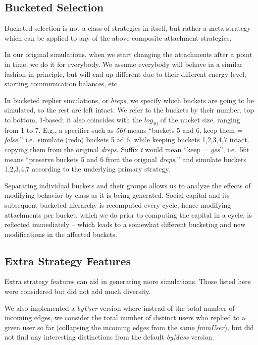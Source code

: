 \documentclass[10pt,oneside]{memoir}
\begin{document}
\begin{Spacing}{2}
\subsection{Bucketed Selection}
\label{bucketedselection}

Bucketed selection is not a class of strategies in itself, but rather a meta-strategy which can be applied to any of the above composite attachment strategies.


In our original simulations, when we start changing the attachments after a point in time, we do it for everybody.  We assume everybody will behave in a similar fashion in principle, but will end up different due to their different energy level, starting communication balances, etc.


In bucketed replier simulations, or {\itshape breps}, we specify which buckets are going to be simulated, so the rest are left intact.  We refer to the buckets by their number, top to bottom, 1-based; it also coincides with the $log_{10}$ of the nucket size, ranging from 1 to 7.  E.g., a specifier such as {\itshape 56f} means ``buckets 5 and 6, keep them = {\itshape false},'' i.e.\ simulate (redo) buckets 5 ad 6, while keeping buckets {1,2,3,4,7} intact, copying them from the original {\itshape dreps}.  Suffix {\itshape t} would mean ``keep = {\itshape yes}'', i.e.\ 56t means ``preserve buckets 5 and 6 from the original {\itshape dreps},'' and simulate buckets {1,2,3,4,7} according to the underlying primary strategy.


Separating individual buckets and their groups allows us to analyze the effects of modifying behavior by class as it is being generated.  Social capital and its subsequent bucketed hierarchy is recomputed every cycle, hence modifying attachments per bucket, which we do prior to computing the capital in a cycle, is reflected immediately -- which leads to a somewhat different bucketing and new modifications in the affected buckets.


\subsection{Extra Strategy Features}
\label{extrastrategyfeatures}

\label{section:extra-strategy-features}
Extra strategy features can aid in generating more simulations.  Those listed here were considered but did not add much diversity.


We also implemented a {\itshape byUser} version where instead of the total number of incoming edges, we consider the total number of distinct users who replied to a given user so far (collapsing the incoming edges from the same \emph{fromUser}), but did not find any interesting distinctions from the default \emph{byMass} version.



\end{Spacing}
\end{document}
